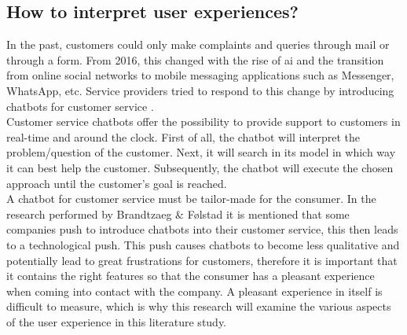 \subsection{How to interpret user experiences?}
In the past, customers could only make complaints and queries through mail or through a form. From 2016, this changed with the rise of \acrshort{ai} and the transition from online social networks to mobile messaging applications such as Messenger, WhatsApp, etc. Service providers tried to respond to this change by introducing chatbots for customer service \citep{Brandtzaeg2018}.\\
\break
Customer service chatbots offer the possibility to provide support to customers in real-time and around the clock. First of all, the chatbot will interpret the problem/question of the customer. Next, it will search in its model in which way it can best help the customer. Subsequently, the chatbot will execute the chosen approach until the customer's goal is reached.\\
\break
A chatbot for customer service must be tailor-made for the consumer. In the research performed by Brandtzaeg \& Følstad \citep{Brandtzaeg2018} it is mentioned that some companies push to introduce chatbots into their customer service, this then leads to a technological push. This push causes chatbots to become less qualitative and potentially lead to great frustrations for customers, therefore it is important that it contains the right features so that the consumer has a pleasant experience when coming into contact with the company. A pleasant experience in itself is difficult to measure, which is why this research will examine the various aspects of the user experience in this literature study.\\

